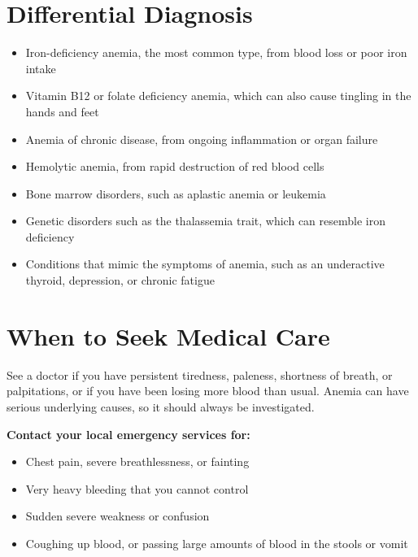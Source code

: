 \section*{Differential Diagnosis}
\begin{itemize}
    \item Iron-deficiency anemia, the most common type, from blood loss or poor iron intake
    \item Vitamin B12 or folate deficiency anemia, which can also cause tingling in the hands and feet
    \item Anemia of chronic disease, from ongoing inflammation or organ failure
    \item Hemolytic anemia, from rapid destruction of red blood cells
    \item Bone marrow disorders, such as aplastic anemia or leukemia
    \item Genetic disorders such as the thalassemia trait, which can resemble iron deficiency
    \item Conditions that mimic the symptoms of anemia, such as an underactive thyroid, depression, or chronic fatigue
\end{itemize}

\section*{When to Seek Medical Care}
See a doctor if you have persistent tiredness, paleness, shortness of breath, or palpitations, or if you have been losing more blood than usual. Anemia can have serious underlying causes, so it should always be investigated.

\textbf{Contact your local emergency services for:}
\begin{itemize}
    \item Chest pain, severe breathlessness, or fainting
    \item Very heavy bleeding that you cannot control
    \item Sudden severe weakness or confusion
    \item Coughing up blood, or passing large amounts of blood in the stools or vomit
\end{itemize}

